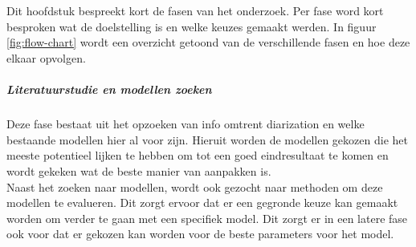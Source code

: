 
\chapter{}%
\label{ch:methodologie}


Dit hoofdstuk bespreekt kort de fasen van het onderzoek. Per fase word kort besproken wat de doelstelling is en welke keuzes gemaakt werden. In figuur \ref{fig:flow-chart} wordt een overzicht getoond van de verschillende fasen en hoe deze elkaar opvolgen.

\paragraph{Literatuurstudie en modellen zoeken}
Deze fase bestaat uit het opzoeken van info omtrent diarization en welke bestaande modellen hier al voor zijn. Hieruit worden de modellen gekozen die het meeste potentieel lijken te hebben om tot een goed eindresultaat te komen en wordt gekeken wat de beste manier van aanpakken is.\\
Naast het zoeken naar modellen, wordt ook gezocht naar methoden om deze modellen te evalueren. Dit zorgt ervoor dat er een gegronde keuze kan gemaakt worden om verder te gaan met een specifiek model. Dit zorgt er in een latere fase ook voor dat er gekozen kan worden voor de beste parameters voor het model.

